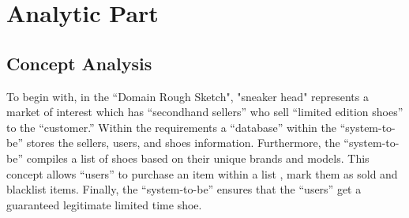 \chapter{Analytic Part}
\newpage
\section{Concept Analysis}
\hspace{1cm} To begin with, in the “Domain Rough Sketch", 
"sneaker head" represents a market of interest which has “secondhand sellers” who sell “limited edition shoes” to the “customer.” 
Within the requirements a “database” within the “system-to-be” stores the sellers, users, and shoes information. 
Furthermore, the “system-to-be” compiles a list of shoes based on their unique brands and models. 
This concept allows “users” to purchase an item within a list , mark them as sold and blacklist items. 
Finally, the “system-to-be” ensures that the “users” get a guaranteed legitimate limited time shoe.
